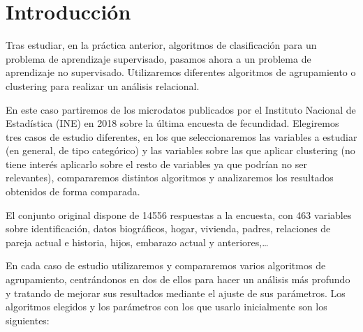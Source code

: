 \documentclass[a4paper, 20pt]{article}
\begin{document}
{\parskip=2pt
  \tableofcontents
}
\pagebreak

\section{Introducción}

Tras estudiar, en la práctica anterior, algoritmos de clasificación para un problema de aprendizaje supervisado, pasamos ahora a un problema de aprendizaje no supervisado. Utilizaremos diferentes algoritmos de agrupamiento o clustering para realizar un análisis relacional.

En este caso partiremos de los microdatos publicados por el Instituto Nacional de Estadística (INE) en 2018 sobre la última encuesta de fecundidad. Elegiremos tres casos de estudio diferentes, en los que seleccionaremos las variables a estudiar (en general, de tipo categórico) y las variables sobre las que aplicar clustering (no tiene interés aplicarlo sobre el resto de variables ya que podrían no ser relevantes), compararemos distintos algoritmos y analizaremos los resultados obtenidos de forma comparada.

El conjunto original dispone de 14556 respuestas a la encuesta, con 463 variables sobre identificación, datos biográficos, hogar, vivienda, padres, relaciones de pareja actual e historia, hijos, embarazo actual y anteriores,\dots

En cada caso de estudio utilizaremos y compararemos varios algoritmos de agrupamiento, centrándonos en dos de ellos para hacer un análisis más profundo y tratando de mejorar sus resultados mediante el ajuste de sus parámetros. Los algoritmos elegidos y los parámetros con los que usarlo inicialmente son los siguientes:
\end{document}
